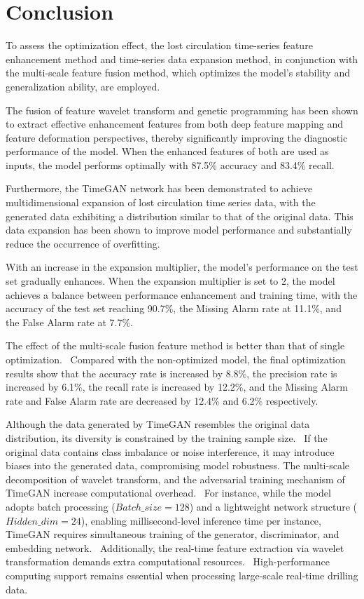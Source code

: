 \documentclass[journal,article,submit,pdftex,moreauthors]{Definitions/mdpi}
\begin{document}
\section{Conclusion}
To assess the optimization effect, the lost circulation time-series feature enhancement method and time-series data expansion method, in conjunction with the multi-scale feature fusion method, which optimizes the model's stability and generalization ability, are employed.


The fusion of feature wavelet transform and genetic programming has been shown to extract effective enhancement features from both deep feature mapping and feature deformation perspectives, thereby significantly improving the diagnostic performance of the model. When the enhanced features of both are used as inputs, the model performs optimally with 87.5\% accuracy and 83.4\% recall.

Furthermore, the TimeGAN network has been demonstrated to achieve multidimensional expansion of lost circulation time series data, with the generated data exhibiting a distribution similar to that of the original data. This data expansion has been shown to improve model performance and substantially reduce the occurrence of overfitting. 

With an increase in the expansion multiplier, the model's performance on the test set gradually enhances. When the expansion multiplier is set to 2, the model achieves a balance between performance enhancement and training time, with the accuracy of the test set reaching 90.7\%, the Missing Alarm rate at 11.1\%, and the False Alarm rate at 7.7\%.

The effect of the multi-scale fusion feature method is better than that of single optimization.  Compared with the non-optimized model, the final optimization results show that the accuracy rate is increased by 8.8\%, the precision rate is increased by 6.1\%, the recall rate is increased by 12.2\%, and the Missing Alarm rate and False Alarm rate are decreased by 12.4\% and 6.2\% respectively.


Although the data generated by TimeGAN resembles the original data distribution, its diversity is constrained by the training sample size.  If the original data contains class imbalance or noise interference, it may introduce biases into the generated data, compromising model robustness. The multi-scale decomposition of wavelet transform, and the adversarial training mechanism of TimeGAN increase computational overhead.  For instance, while the model adopts batch processing ($Batch\_size=128$) and a lightweight network structure ($Hidden\_dim=24$), enabling millisecond-level inference time per instance, TimeGAN requires simultaneous training of the generator, discriminator, and embedding network.  Additionally, the real-time feature extraction via wavelet transformation demands extra computational resources.  High-performance computing support remains essential when processing large-scale real-time drilling data.
\end{document}
